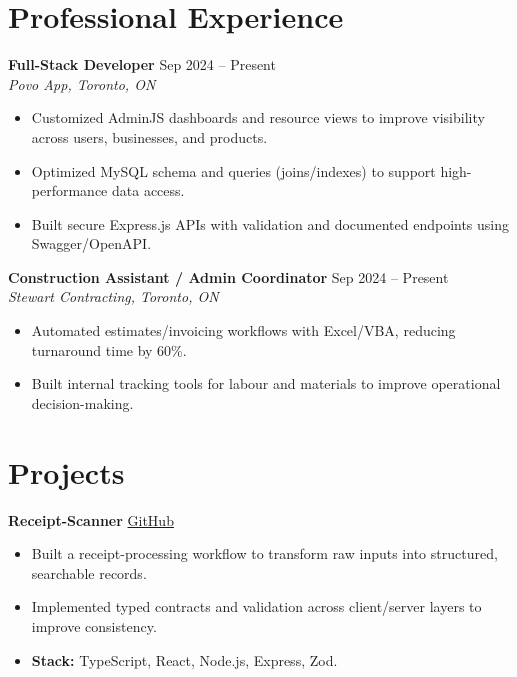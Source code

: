 \documentclass[letterpaper,12pt]{fed-res}
\begin{document}
\section{Professional Experience}

\textbf{Full-Stack Developer} \hfill Sep 2024 -- Present \\
\textit{Povo App, Toronto, ON}
\begin{itemize}[leftmargin=0.15in]
  \item Customized AdminJS dashboards and resource views to improve visibility across users, businesses, and products.
  \item Optimized MySQL schema and queries (joins/indexes) to support high-performance data access.
  \item Built secure Express.js APIs with validation and documented endpoints using Swagger/OpenAPI.
\end{itemize}

\textbf{Construction Assistant / Admin Coordinator} \hfill Sep 2024 -- Present \\
\textit{Stewart Contracting, Toronto, ON}
\begin{itemize}[leftmargin=0.15in]
  \item Automated estimates/invoicing workflows with Excel/VBA, reducing turnaround time by 60\%.
  \item Built internal tracking tools for labour and materials to improve operational decision-making.
\end{itemize}

\section{Projects}

\textbf{Receipt-Scanner} \hfill
\href{https://github.com/mthsdaher/receipt-scanner}{GitHub}
\begin{itemize}[leftmargin=0.15in]
  \item Built a receipt-processing workflow to transform raw inputs into structured, searchable records.
  \item Implemented typed contracts and validation across client/server layers to improve consistency.
  \item \textbf{Stack:} TypeScript, React, Node.js, Express, Zod.
\end{itemize}
\end{document}
